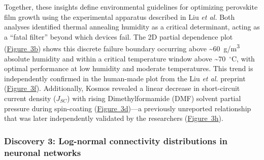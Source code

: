 \documentclass{article}
\begin{document}
Together, these insights define environmental guidelines for optimizing perovskite film growth using the experimental apparatus described in Liu \textit{et al.} Both analyses identified thermal annealing humidity as a critical determinant, acting as a “fatal filter” beyond which devices fail. The 2D partial dependence plot (\hyperref[fig:fig3]{Figure~3b}) shows this discrete failure boundary occurring above \textasciitilde60~g/m\textsuperscript{3} absolute humidity and within a critical temperature window above \textasciitilde70~$^{\circ}$C, with optimal performance at low humidity and moderate temperatures. This trend is independently confirmed in the human-made plot from the Liu \textit{et al.} preprint (\hyperref[fig:fig3]{Figure~3f}). Additionally, Kosmos revealed a linear decrease in short-circuit current density ($J_{SC}$) with rising Dimethylformamide (DMF) solvent partial pressure during spin-coating (\hyperref[fig:fig3]{Figure~3d})---a previously unreported relationship that was later independently validated by the researchers (\hyperref[fig:fig3]{Figure~3h}).


\subsubsection{Discovery 3: Log-normal connectivity distributions in neuronal networks}
\end{document}
